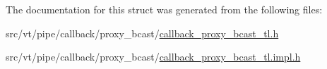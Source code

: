 The documentation for this struct was generated from the following files\+:\begin{DoxyCompactItemize}
\item 
src/vt/pipe/callback/proxy\+\_\+bcast/\hyperlink{callback__proxy__bcast__tl_8h}{callback\+\_\+proxy\+\_\+bcast\+\_\+tl.\+h}\item 
src/vt/pipe/callback/proxy\+\_\+bcast/\hyperlink{callback__proxy__bcast__tl_8impl_8h}{callback\+\_\+proxy\+\_\+bcast\+\_\+tl.\+impl.\+h}\end{DoxyCompactItemize}
